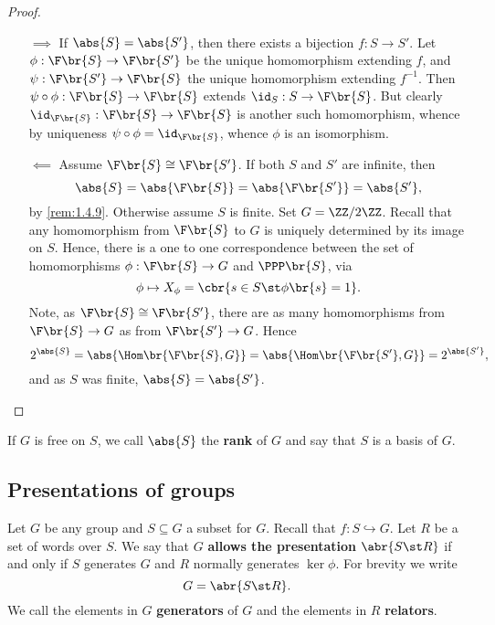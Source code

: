 \begin{proof}
\hfill
\begin{itemize}
\item[$ \implies $] If $ \abs{S} = \abs{S'} $, then there exists a bijection $ f : S \to S' $. Let $ \phi : \F\br{S} \to \F\br{S'} $ be the unique homomorphism extending $ f $, and $ \psi : \F\br{S'} \to \F\br{S} $ the unique homomorphism extending $ f^{-1} $. Then $ \psi \circ \phi : \F\br{S} \to \F\br{S} $ extends $ \id_S : S \to \F\br{S} $. But clearly $ \id_{\F\br{S}} : \F\br{S} \to \F\br{S} $ is another such homomorphism, whence by uniqueness $ \psi \circ \phi = \id_{\F\br{S}} $, whence $ \phi $ is an isomorphism.
\item[$ \impliedby $] Assume $ \F\br{S} \cong \F\br{S'} $. If both $ S $ and $ S' $ are infinite, then
$$ \abs{S} = \abs{\F\br{S}} = \abs{\F\br{S'}} = \abs{S'}, $$
by \ref{rem:1.4.9}. Otherwise assume $ S $ is finite. Set $ G = \ZZ / 2\ZZ $. Recall that any homomorphism from $ \F\br{S} $ to $ G $ is uniquely determined by its image on $ S $. Hence, there is a one to one correspondence between the set of homomorphisms $ \phi : \F\br{S} \to G $ and $ \PPP\br{S} $, via
$$ \phi \mapsto X_\phi = \cbr{s \in S \st \phi\br{s} = 1}. $$
Note, as $ \F\br{S} \cong \F\br{S'} $, there are as many homomorphisms from $ \F\br{S} \to G $ as from $ \F\br{S'} \to G $. Hence
$$ 2^{\abs{S}} = \abs{\Hom\br{\F\br{S}, G}} = \abs{\Hom\br{\F\br{S'}, G}} = 2^{\abs{S'}}, $$
and as $ S $ was finite, $ \abs{S} = \abs{S'} $.
\end{itemize}
\end{proof}

\begin{definition}
If $ G $ is free on $ S $, we call $ \abs{S} $ the \textbf{rank} of $ G $ and say that $ S $ is a basis of $ G $.
\end{definition}

\pagebreak

\subsection{Presentations of groups}

\begin{definition}
Let $ G $ be any group and $ S \subseteq G $ a subset for $ G $. Recall that $ f : S \hookrightarrow G $. Let $ R $ be a set of words over $ S $. We say that $ G $ \textbf{allows the presentation} $ \abr{S \st R} $ if and only if $ S $ generates $ G $ and $ R $ normally generates $ \ker \phi $. For brevity we write
$$ G = \abr{S \st R}. $$
We call the elements in $ G $ \textbf{generators} of $ G $ and the elements in $ R $ \textbf{relators}.
\end{definition}

